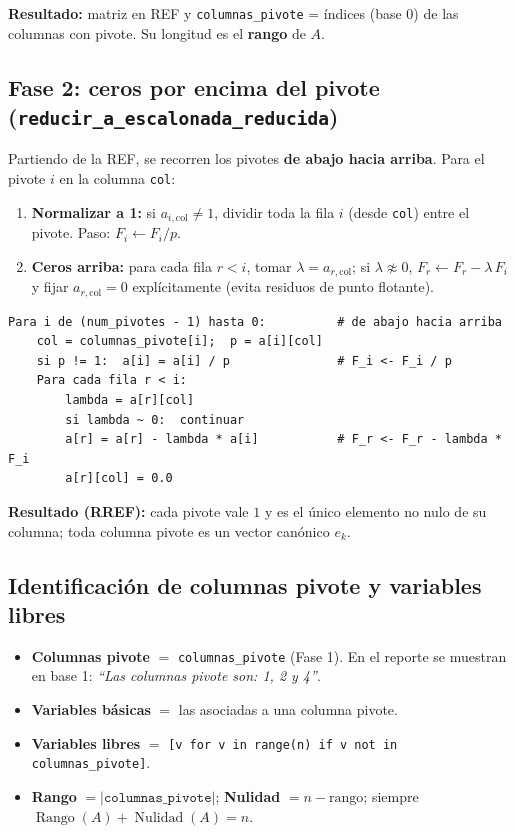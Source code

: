 \documentclass[11pt,a4paper]{article}
\begin{document}
\noindent\textbf{Resultado:} matriz en REF y \texttt{columnas\_pivote} = \'indices
(base 0) de las columnas con pivote. Su longitud es el \textbf{rango} de $A$.

\subsection{Fase 2: ceros por encima del pivote (\texttt{reducir\_a\_escalonada\_reducida})}

Partiendo de la REF, se recorren los pivotes \textbf{de abajo hacia arriba}. Para el
pivote $i$ en la columna \texttt{col}:

\begin{enumerate}[nosep]
  \item \textbf{Normalizar a 1:} si $a_{i,\text{col}} \neq 1$, dividir toda la fila
        $i$ (desde \texttt{col}) entre el pivote. Paso: $F_i \leftarrow F_i / p$.
  \item \textbf{Ceros arriba:} para cada fila $r < i$, tomar
        $\lambda = a_{r,\text{col}}$; si $\lambda \not\approx 0$,
        $F_r \leftarrow F_r - \lambda\,F_i$ y fijar $a_{r,\text{col}} = 0$
        expl\'icitamente (evita residuos de punto flotante).
\end{enumerate}

\begin{lstlisting}
Para i de (num_pivotes - 1) hasta 0:          # de abajo hacia arriba
    col = columnas_pivote[i];  p = a[i][col]
    si p != 1:  a[i] = a[i] / p               # F_i <- F_i / p
    Para cada fila r < i:
        lambda = a[r][col]
        si lambda ~ 0:  continuar
        a[r] = a[r] - lambda * a[i]           # F_r <- F_r - lambda * F_i
        a[r][col] = 0.0
\end{lstlisting}

\noindent\textbf{Resultado (RREF):} cada pivote vale $1$ y es el \'unico elemento no
nulo de su columna; toda columna pivote es un vector can\'onico $e_k$.

\subsection{Identificaci\'on de columnas pivote y variables libres}

\begin{itemize}[nosep]
  \item \textbf{Columnas pivote} $=$ \texttt{columnas\_pivote} (Fase 1). En el
        reporte se muestran en base 1: \emph{``Las columnas pivote son: 1, 2 y 4''}.
  \item \textbf{Variables b\'asicas} $=$ las asociadas a una columna pivote.
  \item \textbf{Variables libres} $=$
        \texttt{[v for v in range(n) if v not in columnas\_pivote]}.
  \item \textbf{Rango} $= |\texttt{columnas\_pivote}|$;\quad
        \textbf{Nulidad} $= n - \text{rango}$;\quad
        siempre $\operatorname{Rango}(A) + \operatorname{Nulidad}(A) = n$.
\end{itemize}
\end{document}
